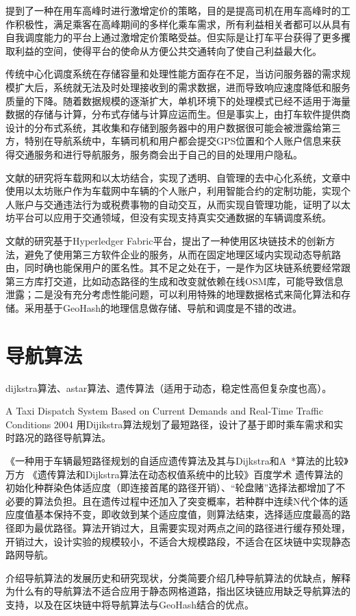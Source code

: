 提到了一种在用车高峰时进行激增定价的策略，目的是提高司机在用车高峰时的工作积极性，满足乘客在高峰期间的多样化乘车需求，所有利益相关者都可以从具有自我调度能力的平台上通过激增定价策略受益。但实际是让打车平台获得了更多攫取利益的空间，使得平台的使命从方便公共交通转向了使自己利益最大化。\par

传统中心化调度系统在存储容量和处理性能方面存在不足，当访问服务器的需求规模扩大后，系统就无法及时处理接收到的需求数据，进而导致响应速度降低和服务质量的下降。随着数据规模的逐渐扩大，单机环境下的处理模式已经不适用于海量数据的存储与计算，分布式存储与计算应运而生。但是事实上，由打车软件提供商设计的分布式系统，其收集和存储到服务器中的用户数据很可能会被泄露给第三方，特别在导航系统中，车辆司机和用户都会提交GPS位置和个人账户信息来获得交通服务和进行导航服务，服务商会出于自己的目的处理用户隐私。\par

文献的研究将车载网和以太坊结合，实现了透明、自管理的去中心化系统，文章中使用以太坊账户作为车载网中车辆的个人账户，利用智能合约的定制功能，实现个人账户与交通违法行为或税费事物的自动交互，从而实现自管理功能，证明了以太坊平台可以应用于交通领域，但没有实现支持真实交通数据的车辆调度系统。\par

文献的研究基于Hyperledger Fabric平台，提出了一种使用区块链技术的创新方法，避免了使用第三方软件企业的服务，从而在固定地理区域内实现动态导航路由，同时确也能保用户的匿名性。其不足之处在于，一是作为区块链系统要经常跟第三方库打交道，比如动态路径的生成和改变就依赖在线OSM库，可能导致信息泄露；二是没有充分考虑性能问题，可以利用特殊的地理数据格式来简化算法和存储。采用基于GeoHash的地理信息做存储、导航和调度是不错的改进。

\section{导航算法}

dijkstra算法、astar算法、遗传算法（适用于动态，稳定性高但复杂度也高）。

A Taxi Dispatch System Based on Current Demands and Real-Time Traffic Conditions 2004 用Dijikstra算法规划了最短路径，设计了基于即时乘车需求和实时路况的路径导航算法。

《一种用于车辆最短路径规划的自适应遗传算法及其与Dijkstra和A~*算法的比较》万方
《遗传算法和Dijkstra算法在动态权值系统中的比较》百度学术
遗传算法的初始化种群染色体适应度（即连接首尾的路径开销）、“轮盘赌”选择法都增加了不必要的算法负担。且在遗传过程中还加入了突变概率，若种群中连续N代个体的适应度值基本保持不变，即收敛到某个适应度值，则算法结束，选择适应度最高的路径即为最优路径。算法开销过大，且需要实现对两点之间的路径进行缓存预处理，开销过大，设计实验的规模较小，不适合大规模路段，不适合在区块链中实现静态路网导航。



介绍导航算法的发展历史和研究现状，分类简要介绍几种导航算法的优缺点，解释为什么有的导航算法不适合应用于静态网格道路，指出区块链应用缺乏导航算法的支持，以及在区块链中将导航算法与GeoHash结合的优点。



